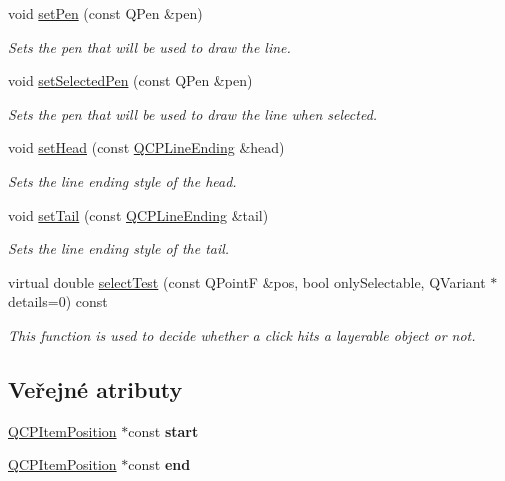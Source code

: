 \begin{DoxyCompactItemize}
\item 
void \hyperlink{classQCPItemLine_a572528dab61c1abe205822fbd5db4b27}{set\+Pen} (const Q\+Pen \&pen)
\begin{DoxyCompactList}\small\item\em Sets the pen that will be used to draw the line. \end{DoxyCompactList}\item 
void \hyperlink{classQCPItemLine_a3e2fec44503277e77717e9c24f87f1ea}{set\+Selected\+Pen} (const Q\+Pen \&pen)
\begin{DoxyCompactList}\small\item\em Sets the pen that will be used to draw the line when selected. \end{DoxyCompactList}\item 
void \hyperlink{classQCPItemLine_aebf3d687114d584e0459db6759e2c3c3}{set\+Head} (const \hyperlink{classQCPLineEnding}{Q\+C\+P\+Line\+Ending} \&head)
\begin{DoxyCompactList}\small\item\em Sets the line ending style of the head. \end{DoxyCompactList}\item 
void \hyperlink{classQCPItemLine_ac264222c3297a7efe33df9345c811a5f}{set\+Tail} (const \hyperlink{classQCPLineEnding}{Q\+C\+P\+Line\+Ending} \&tail)
\begin{DoxyCompactList}\small\item\em Sets the line ending style of the tail. \end{DoxyCompactList}\item 
virtual double \hyperlink{classQCPItemLine_a7541e5d9378ca121d07b0df3b24f7178}{select\+Test} (const Q\+Point\+F \&pos, bool only\+Selectable, Q\+Variant $\ast$details=0) const 
\begin{DoxyCompactList}\small\item\em This function is used to decide whether a click hits a layerable object or not. \end{DoxyCompactList}\end{DoxyCompactItemize}
\subsection*{Veřejné atributy}
\begin{DoxyCompactItemize}
\item 
\hypertarget{classQCPItemLine_a602da607a09498b0f152ada1d6851bc5}{}\hyperlink{classQCPItemPosition}{Q\+C\+P\+Item\+Position} $\ast$const {\bfseries start}\label{classQCPItemLine_a602da607a09498b0f152ada1d6851bc5}

\item 
\hypertarget{classQCPItemLine_a15598864c1c22a2497a1979c4980c4e1}{}\hyperlink{classQCPItemPosition}{Q\+C\+P\+Item\+Position} $\ast$const {\bfseries end}\label{classQCPItemLine_a15598864c1c22a2497a1979c4980c4e1}

\end{DoxyCompactItemize}
